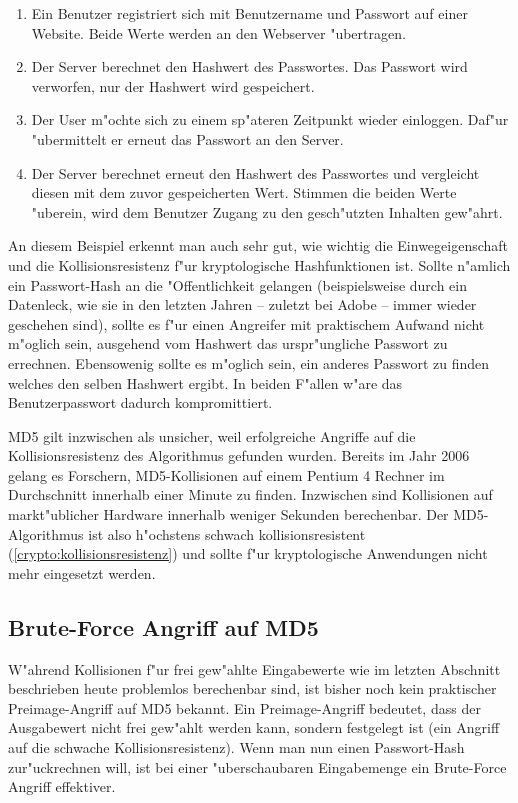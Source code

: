 \begin{refsection}
\begin{enumerate}
		\item Ein Benutzer registriert sich mit Benutzername und Passwort auf einer
			Website. Beide Werte werden an den Webserver "ubertragen.
		\item Der Server berechnet den Hashwert des Passwortes. Das Passwort wird
			verworfen, nur der Hashwert wird gespeichert.
		\item Der User m"ochte sich zu einem sp"ateren Zeitpunkt wieder einloggen.
			Daf"ur "ubermittelt er erneut das Passwort an den Server.
		\item Der Server berechnet erneut den Hashwert des Passwortes und
			vergleicht diesen mit dem zuvor gespeicherten Wert. Stimmen die beiden
			Werte "uberein, wird dem Benutzer Zugang zu den gesch"utzten Inhalten
			gew"ahrt.
\end{enumerate}

An diesem Beispiel erkennt man auch sehr gut, wie wichtig die Einwegeigenschaft
und die Kollisionsresistenz f"ur kryptologische Hashfunktionen ist. Sollte
n"amlich ein Passwort-Hash an die "Offentlichkeit gelangen (beispielsweise durch
ein Datenleck, wie sie in den letzten Jahren -- zuletzt bei Adobe -- immer
wieder geschehen sind), sollte es f"ur einen Angreifer mit praktischem Aufwand
nicht m"oglich sein, ausgehend vom Hashwert das urspr"ungliche Passwort zu
errechnen. Ebensowenig sollte es m"oglich sein, ein anderes Passwort zu finden
welches den selben Hashwert ergibt. In beiden F"allen w"are das Benutzerpasswort
dadurch kompromittiert.

MD5 gilt inzwischen als unsicher, weil erfolgreiche Angriffe auf die
Kollisionsresistenz des Algorithmus gefunden wurden. Bereits im Jahr 2006 gelang
es Forschern, MD5-Kollisionen auf einem Pentium 4 Rechner im Durchschnitt
innerhalb einer Minute zu finden\cite{crypto:stevens2006fast}. Inzwischen sind
Kollisionen auf markt"ublicher Hardware innerhalb weniger Sekunden berechenbar.
Der MD5-Algorithmus ist also h"ochstens schwach kollisionsresistent
(\ref{crypto:kollisionsresistenz}) und sollte f"ur kryptologische Anwendungen
nicht mehr eingesetzt werden.

\subsection{Brute-Force Angriff auf MD5}

W"ahrend Kollisionen f"ur frei gew"ahlte Eingabewerte wie im letzten Abschnitt
beschrieben heute problemlos berechenbar sind, ist bisher noch kein praktischer
Preimage-Angriff auf MD5 bekannt. Ein Preimage-Angriff bedeutet, dass der
Ausgabewert nicht frei gew"ahlt werden kann, sondern festgelegt ist (ein Angriff
auf die schwache Kollisionsresistenz). Wenn man nun einen Passwort-Hash
zur"uckrechnen will, ist bei einer "uberschaubaren Eingabemenge ein Brute-Force
Angriff effektiver.


\end{refsection}
